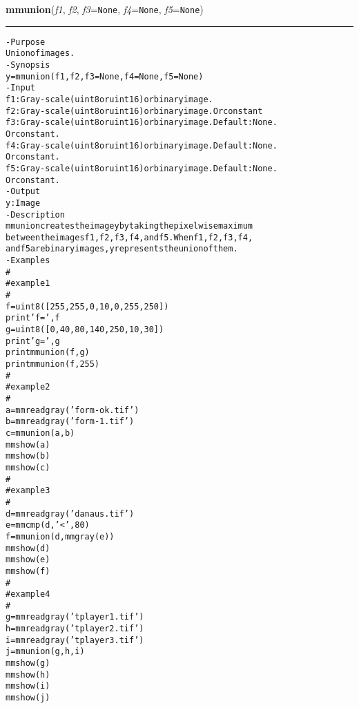     \label{multireg:num_pymorph:mmunion}
    \vspace{0.5ex}

    \begin{boxedminipage}{\textwidth}

    \raggedright \textbf{mmunion}(\textit{f1}, \textit{f2}, \textit{f3}=\texttt{N\-o\-n\-e\-}, \textit{f4}=\texttt{N\-o\-n\-e\-}, \textit{f5}=\texttt{N\-o\-n\-e\-})

    \vspace{-1.5ex}

    \rule{\textwidth}{0.5\fboxrule}
\begin{alltt}
- Purpose
    Union of images.
- Synopsis
    y = mmunion(f1, f2, f3=None, f4=None, f5=None)
- Input
    f1: Gray-scale (uint8 or uint16) or binary image.
    f2: Gray-scale (uint8 or uint16) or binary image. Or constant
    f3: Gray-scale (uint8 or uint16) or binary image. Default: None.
        Or constant.
    f4: Gray-scale (uint8 or uint16) or binary image. Default: None.
        Or constant.
    f5: Gray-scale (uint8 or uint16) or binary image. Default: None.
        Or constant.
- Output
    y: Image
- Description
    mmunion creates the image y by taking the pixelwise maximum
    between the images f1, f2, f3, f4, and f5 . When f1, f2, f3, f4,
    and f5 are binary images, y represents the union of them.
- Examples
    \#
    \#   example 1
    \#
    f=uint8([255, 255,  0,  10,   0, 255, 250])
    print 'f=',f
    g=uint8([  0,  40, 80, 140, 250,  10,  30])
    print 'g=',g
    print mmunion(f, g)
    print mmunion(f, 255)
    \#
    \#   example 2
    \#
    a = mmreadgray('form-ok.tif')
    b = mmreadgray('form-1.tif')
    c = mmunion(a,b)
    mmshow(a)
    mmshow(b)
    mmshow(c)
    \#
    \#   example 3
    \#
    d = mmreadgray('danaus.tif')
    e = mmcmp(d,'{\textless}',80)
    f = mmunion(d,mmgray(e))
    mmshow(d)
    mmshow(e)
    mmshow(f)
    \#
    \#   example 4
    \#
    g = mmreadgray('tplayer1.tif')
    h = mmreadgray('tplayer2.tif')
    i = mmreadgray('tplayer3.tif')
    j = mmunion(g,h,i)
    mmshow(g)
    mmshow(h)
    mmshow(i)
    mmshow(j)\end{alltt}

    \vspace{1ex}

    \end{boxedminipage}

    \label{multireg:num_pymorph:mmvdome}
    \vspace{0.5ex}

